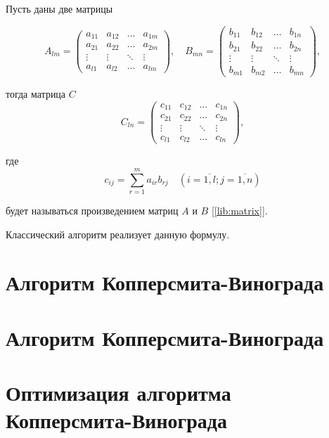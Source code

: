 Пусть даны две матрицы

\begin{equation}
	A_{lm} = \begin{pmatrix}
		a_{11} & a_{12} & \ldots & a_{1m}\\
		a_{21} & a_{22} & \ldots & a_{2m}\\
		\vdots & \vdots & \ddots & \vdots\\
		a_{l1} & a_{l2} & \ldots & a_{lm}
	\end{pmatrix},
	\quad
	B_{mn} = \begin{pmatrix}
		b_{11} & b_{12} & \ldots & b_{1n}\\
		b_{21} & b_{22} & \ldots & b_{2n}\\
		\vdots & \vdots & \ddots & \vdots\\
		b_{m1} & b_{m2} & \ldots & b_{mn}
	\end{pmatrix},
\end{equation}

тогда матрица $C$
\begin{equation}
	C_{ln} = \begin{pmatrix}
		c_{11} & c_{12} & \ldots & c_{1n}\\
		c_{21} & c_{22} & \ldots & c_{2n}\\
		\vdots & \vdots & \ddots & \vdots\\
		c_{l1} & c_{l2} & \ldots & c_{ln}
	\end{pmatrix},
\end{equation}

где
\begin{equation}
	\label{eq:M}
	c_{ij} =
	\sum_{r=1}^{m} a_{ir}b_{rj} \quad (i=\overline{1,l}; j=\overline{1,n})
\end{equation}

будет называться произведением матриц $A$ и $B$ [\ref{lib:matrix}].

Классический алгоритм реализует данную формулу.

\section{Алгоритм Копперсмита-Винограда}



\section{Алгоритм Копперсмита-Винограда}

\section{Оптимизация алгоритма Копперсмита-Винограда}